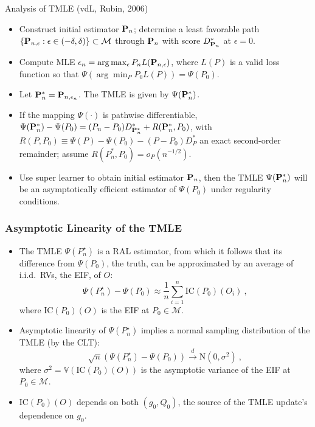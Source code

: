 \documentclass[t]{beamer}
\begin{document}
\begin{frame}{Analysis of TMLE (vdL, Rubin, 2006)}
\begin{itemize}
\item Construct initial estimator ${\bf P}_n$; determine a least favorable path
  $\{{\bf P}_{n,\epsilon}:\epsilon\in (-\delta,\delta)\}\subset {\cal M}$
  through ${\bf P}_n$ with score $D^*_{{\bf P}_n}$ at $\epsilon = 0$.
\item Compute MLE $\epsilon_n =\arg\max_{\epsilon}P_n L({\bf P}_{n,\epsilon})$,
  where $L(P)$ is a valid loss function so that $\Psi(\arg\min_P
  P_0L(P))=\Psi(P_0)$.
\item Let ${\bf P}_n^*={\bf P}_{n,\epsilon_n}$. The TMLE is given by $\Psi({\bf
  P}_n^*)$.
\item If the mapping $\Psi(\cdot)$ is pathwise differentiable,
  $\Psi({\bf P}_n^*)-\Psi(P_0)=(P_n-P_0)D^*_{{\bf P}_n^*}+R({\bf P}_n^*,P_0)$,
  with $R(P,P_0)\equiv \Psi(P)-\Psi(P_0)-(P-P_0)D^*_P$ an exact second-order
  remainder; assume $R(P_n^*,P_0) = o_P(n^{-1/2})$.
\item Use super learner to obtain initial estimator ${\bf P}_n$, then the TMLE
  $\Psi({\bf P}_n^*)$ will be an asymptotically efficient estimator of
  $\Psi(P_0)$ under regularity conditions.
\end{itemize}
\end{frame}

\begin{frame}
  \frametitle{Asymptotic Linearity of the TMLE}
  \begin{itemize}
    \item The TMLE $\Psi(P_n^{\star})$ is a RAL estimator, from which it follows
      that its difference from $\Psi(P_0)$, the truth, can be approximated by
      an average of i.i.d.~RVs, the EIF, of $O$:
      $$\Psi(P_n^{\star}) - \Psi(P_0) \approx \frac{1}{n}\sum_{i=1}^n
        \text{IC}(P_0)(O_i) \ ,$$ where $\text{IC}(P_0)(O)$ is the EIF at
        $P_0 \in \mathcal{M}$.
    \item Asymptotic linearity of $\Psi(P_n^{\star})$ implies a normal sampling
      distribution of the TMLE (by the CLT):
      $$\sqrt{n}(\Psi(P_n^{\star}) - \Psi(P_0)) \xrightarrow{d} \text{N}(0,
        \sigma^2) \ ,$$ where $\sigma^2 = \mathbb{V}(\text{IC}(P_0)(O))$ is the
        asymptotic variance of the EIF at $P_0 \in \mathcal{M}$.
    \item $\text{IC}(P_0)(O)$ depends on both $(g_0, Q_0)$, the source of the
      TMLE update's dependence on $g_0$.
  \end{itemize}
\end{frame}
\end{document}
